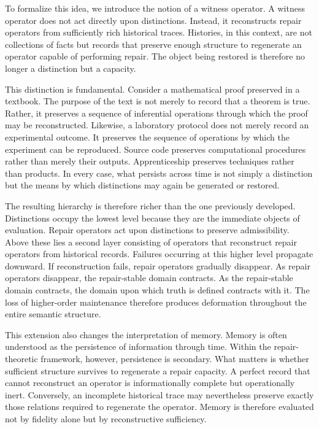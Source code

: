 \documentclass[12pt,oneside]{article}
\theoremstyle{plain}
\theoremstyle{definition}
\theoremstyle{remark}
\theoremstyle{plain}
\begin{document}
To formalize this idea, we introduce the notion of a witness operator. A witness operator does not
act directly upon distinctions. Instead, it reconstructs repair operators from sufficiently rich
historical traces. Histories, in this context, are not collections of facts but records that
preserve enough structure to regenerate an operator capable of performing repair. The object being
restored is therefore no longer a distinction but a capacity.

This distinction is fundamental. Consider a mathematical proof preserved in a textbook. The purpose
of the text is not merely to record that a theorem is true. Rather, it preserves a sequence of
inferential operations through which the proof may be reconstructed. Likewise, a laboratory
protocol does not merely record an experimental outcome. It preserves the sequence of operations
by which the experiment can be reproduced. Source code preserves computational procedures rather
than merely their outputs. Apprenticeship preserves techniques rather than products. In every case,
what persists across time is not simply a distinction but the means by which distinctions may again
be generated or restored.

The resulting hierarchy is therefore richer than the one previously developed. Distinctions occupy
the lowest level because they are the immediate objects of evaluation. Repair operators act upon
distinctions to preserve admissibility. Above these lies a second layer consisting of operators
that reconstruct repair operators from historical records. Failures occurring at this higher level
propagate downward. If reconstruction fails, repair operators gradually disappear. As repair
operators disappear, the repair-stable domain contracts. As the repair-stable domain contracts, the
domain upon which truth is defined contracts with it. The loss of higher-order maintenance therefore
produces deformation throughout the entire semantic structure.

This extension also changes the interpretation of memory. Memory is often understood as the
persistence of information through time. Within the repair-theoretic framework, however, persistence
is secondary. What matters is whether sufficient structure survives to regenerate a repair capacity.
A perfect record that cannot reconstruct an operator is informationally complete but operationally
inert. Conversely, an incomplete historical trace may nevertheless preserve exactly those relations
required to regenerate the operator. Memory is therefore evaluated not by fidelity alone but by
reconstructive sufficiency.
\end{document}
